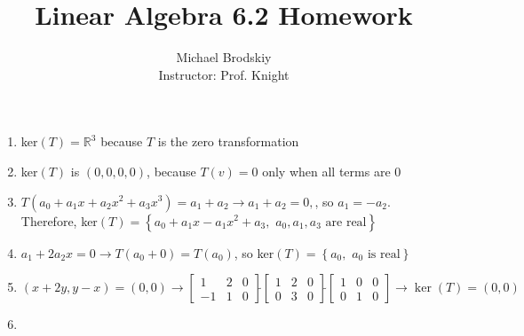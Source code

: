 \documentclass[12pt]{article}
\title{Linear Algebra 6.2 Homework}
\date{}
\author{Michael Brodskiy\\ \small Instructor: Prof. Knight}
\begin{document}
\maketitle

\begin{enumerate}

    \begin{center}
      \underline{1-27 odd, 31, 33, 39, 41, 44, 45, 47, 54, 55, 57}
    \end{center}

  \item ker$(T)=\mathbb{R}^3$ because $T$ is the zero transformation

    \setcounter{enumi}{2}

  \item ker$(T)$ is $(0,0,0,0)$, because $T(v)=0$ only when all terms are 0

    \setcounter{enumi}{4}

  \item $T(a_0+a_1x+a_2x^2+a_3x^3)=a_1+a_2\rightarrow a_1+a_2=0,$, so $a_1=-a_2$. Therefore, ker$(T)=\left\{a_0+a_1x-a_1x^2+a_3,\,\,a_0,a_1,a_3\text{ are real}\right\}$

    \setcounter{enumi}{6}

  \item $a_1+2a_2x=0\rightarrow T(a_0+0)=T(a_0)$, so ker$(T)=\left\{ a_0,\,\, a_0\text{ is real} \right\}$

    \setcounter{enumi}{8}

  \item $(x+2y,y-x)=(0,0)\rightarrow \left[ \begin{array}{cc|c} 1 & 2 & 0\\ -1 & 1 & 0 \end{array}\right]\widetilde{ }\left[ \begin{array}{cc|c} 1 & 2 & 0\\ 0 & 3 & 0  \end{array} \right]\widetilde{ }\left[ \begin{array}{cc|c} 1 & 0 & 0\\ 0 & 1 & 0 \end{array} \right]\rightarrow \ker(T)=(0,0)$

    \setcounter{enumi}{10}

  \item

    \begin{enumerate}


\end{enumerate}
\end{enumerate}
\end{document}
